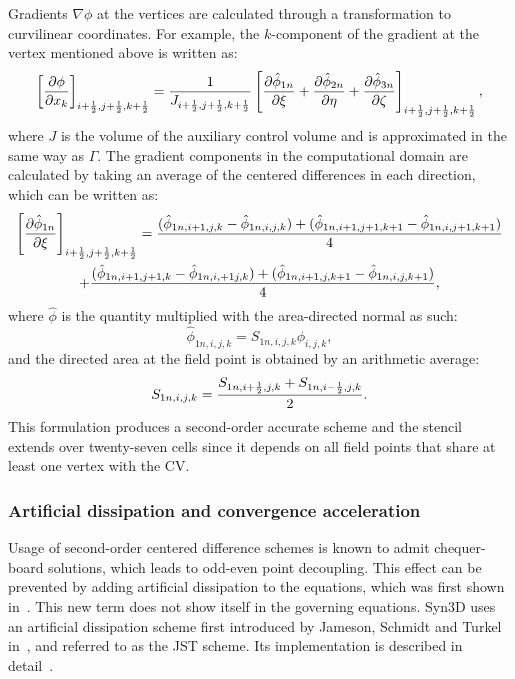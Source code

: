 Gradients $\nabla \phi$ at the vertices are calculated through a transformation to curvilinear coordinates. For example, the $k$-component of the gradient at the vertex mentioned above is written as:
\begin{equation}
    \left[ \pdiff{\phi}{x_k} \right]_{i+\half,j+\half,k+\half} =
        \frac{1}{J_{i+\half,j+\half,k+\half}}
        \left[
            \pdiff{\hat{\phi}_{1n}}{\xi} + \pdiff{\hat{\phi}_{2n}}{\eta} + \pdiff{\hat{\phi}_{3n}}{\zeta}
        \right]_{i+\half,j+\half,k+\half}
    \label{eq:velgradvertex},
\end{equation}
where $J$ is the volume of the auxiliary control volume and is approximated in the same way as $\Gamma$. The gradient components in the computational domain are calculated by taking an average of the centered differences in each direction, which can be written as:
\begin{gather*}
    \left[
        \pdiff{\hat{\phi}_{1n}}{\xi}
    \right]_{i+\half,j+\half,k+\half}
    = \frac{
        (\hat{\phi}_{1n,i+1,j,k} - \hat{\phi}_{1n,i,j,k})
      + (\hat{\phi}_{1n,i+1,j+1,k+1} - \hat{\phi}_{1n,i,j+1,k+1})
    }{4}\\
    + \frac{
        (\hat{\phi}_{1n,i+1,j+1,k} - \hat{\phi}_{1n,i,+1j,k})
      + (\hat{\phi}_{1n,i+1,j,k+1} - \hat{\phi}_{1n,i,j,k+1})
    }{4},
\end{gather*}
where $\hat{\phi}$ is the quantity multiplied with the area-directed normal as such:
\begin{equation*}
    \hat{\phi}_{1n,i,j,k} = S_{1n,i,j,k}\phi_{i,j,k},
\end{equation*}
and the directed area at the field point is obtained by an arithmetic average:
\begin{equation*}
    S_{1n,i,j,k} = \frac{S_{1n,i+\frac{1}{2},j,k} + S_{1n,i-\frac{1}{2},j,k}}{2}.
\end{equation*}
This formulation produces a second-order accurate scheme and the stencil extends over twenty-seven cells since it depends on all field points that share at least one vertex with the CV.
%
\subsubsection{Artificial dissipation and convergence acceleration}
Usage of second-order centered difference schemes is known to admit chequer-board solutions, which leads to odd-even point decoupling. This effect can be prevented by adding artificial dissipation to the equations, which was first shown in~\cite{vonneumann1950method}. This new term does not show itself in the governing equations. Syn3D uses an artificial dissipation scheme first introduced by Jameson, Schmidt and Turkel in~\cite{jameson1981numerical}, and referred to as the JST scheme. Its implementation is described in detail~\cite{nadarajah2003discrete}.

